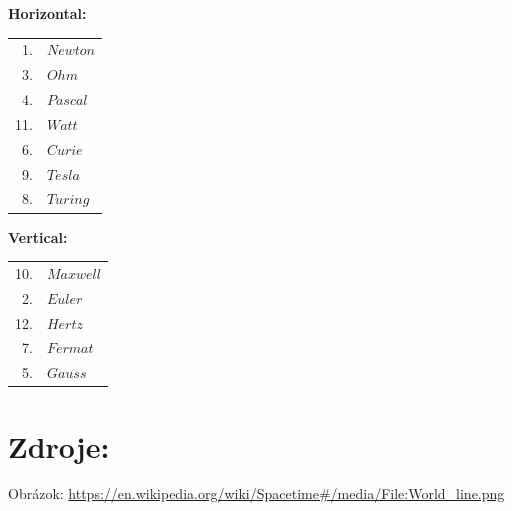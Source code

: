 \documentclass{article}
\begin{document}
\begin{center}
\begin{minipage}[t]{0.42\textwidth}
\centering
\textbf{Horizontal:} \\[0.4em]
\begin{tabular}{r l}
1. & $Newton$ \\
3. & $Ohm$ \\
4. & $Pascal$ \\
11. & $Watt$ \\
6. & $Curie$ \\
9. & $Tesla$ \\
8. & $Turing$
\end{tabular}
\end{minipage}%
\begin{minipage}[t]{0.42\textwidth}
\centering
\textbf{Vertical:} \\[0.4em]
\begin{tabular}{r l}
10. & $Maxwell$ \\
2. & $Euler$ \\
12. & $Hertz$ \\
7. & $Fermat$ \\
5. & $Gauss$
\end{tabular}
\end{minipage}
\end{center}
\vspace{30mm}
\section{Zdroje:}
Obrázok: \url{https://en.wikipedia.org/wiki/Spacetime#/media/File:World_line.png}
\end{document}
